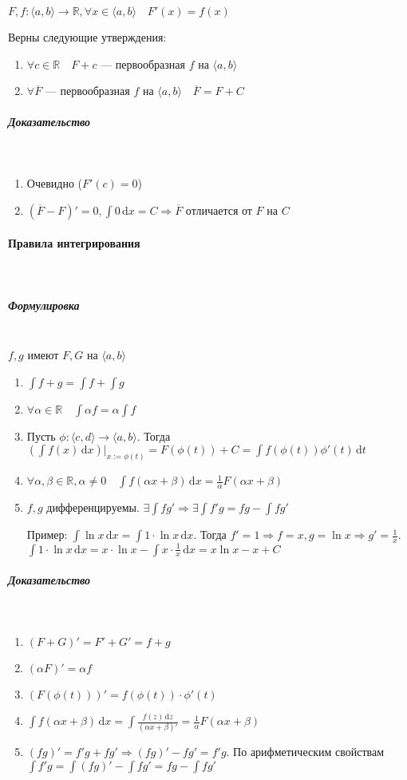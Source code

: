 \documentclass{article}
\def\D{\,\mathrm{d}}
\let\vanillaparagraph\paragraph
\let\vanillasubparagraph\subparagraph
\renewcommand{\paragraph}[1]{\vanillaparagraph{#1}\mbox{}\\}
\renewcommand{\subparagraph}[1]{\vanillasubparagraph{#1}\mbox{}\\}
\begin{document}
$F, f: \langle a, b\rangle \rightarrow \mathbb{R}, \forall x \in \langle a, b\rangle \quad F'(x) = f(x)$

Верны следующие утверждения:
\begin{enumerate}
    \item $\forall c \in \mathbb{R} \quad F + c$ --- первообразная $f$ на $\langle a, b \rangle$
    \item $\forall \overline{F}$ --- первообразная $f$ на $\langle a, b\rangle \quad \overline{F} = F + C$
\end{enumerate}

\subparagraph{Доказательство}
\begin{enumerate}
    \item Очевидно ($F'(c) = 0$)
    \item $(\overline{F} - F)' = 0, \int 0 \D x = C \Rightarrow \overline{F}$ отличается от $F$ на $C$
\end{enumerate}


\paragraph{Правила интегрирования}
\subparagraph{Формулировка}
$f, g$ имеют $F, G$ на $\langle a, b\rangle$

\begin{enumerate}
    \item $\int f + g = \int f + \int g$
    \item $\forall \alpha \in \mathbb{R} \quad \int \alpha f = \alpha \int f$
    \item Пусть $\phi: \langle c, d \rangle \rightarrow \langle a, b \rangle$. Тогда $(\int f(x) \D x)|_{x:= \phi(t)} = F(\phi(t)) + C = \int f(\phi(t))\phi'(t) \D t$
    \item $\forall \alpha, \beta \in \mathbb{R}, \alpha \ne 0 \quad \int f(\alpha x + \beta) \D x = \frac{1}{\alpha}F(\alpha x + \beta)$
    \item $f, g$ дифференцируемы. $\exists \int fg' \Rightarrow \exists \int f'g = fg - \int fg'$
    
    Пример: $\int \ln x \D x = \int 1 \cdot \ln x \D x$. Тогда $f' = 1 \Rightarrow f = x, g = \ln x \Rightarrow g' = \frac{1}{x}$. $\int 1 \cdot \ln x \D x = x \cdot \ln x - \int x \cdot \frac{1}{x} \D x = x\ln x - x + C$ 
\end{enumerate}

\subparagraph{Доказательство}
\begin{enumerate}
    \item $(F + G)' = F' + G' = f+g$
    \item $(\alpha F)' = \alpha f$
    \item $(F(\phi(t)))' = f(\phi(t)) \cdot \phi'(t)$
    \item $\int f(\alpha x + \beta) \D x = \int \frac{f(z) \D z}{(\alpha x + \beta)'} = \frac{1}{\alpha}F(\alpha x + \beta)$
    \item $(fg)' = f'g + fg' \Rightarrow (fg)' - fg' = f'g$. По арифметическим свойствам $\int f'g = \int (fg)' - \int fg' = fg - \int fg'$
\end{enumerate}
\end{document}
